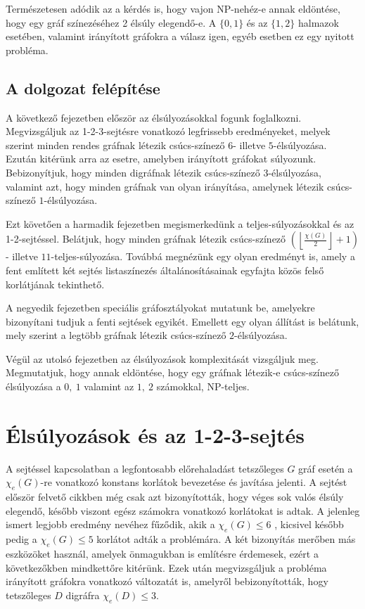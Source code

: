 \documentclass[12pt, a4paper]{report}
\theoremstyle{remark}
\theoremstyle{definition}
\begin{document}
Természetesen adódik az a kérdés is, hogy vajon NP-nehéz-e annak eldöntése, hogy egy gráf színezéséhez 2 élsúly elegendő-e. A $\lbrace 0, 1 \rbrace$ és az $\lbrace 1, 2 \rbrace$ halmazok esetében, valamint irányított gráfokra a válasz igen, egyéb esetben ez egy nyitott probléma.

\section{A dolgozat felépítése}

A következő fejezetben először az élsúlyozásokkal fogunk foglalkozni. Megvizsgáljuk az 1-2-3-sejtésre vonatkozó legfrissebb eredményeket, melyek szerint minden rendes gráfnak létezik csúcs-színező $6$- illetve $5$-élsúlyozása. Ezután kitérünk arra az esetre, amelyben irányított gráfokat súlyozunk. Bebizonyítjuk, hogy minden digráfnak létezik csúcs-színező $3$-élsúlyozása, valamint azt, hogy minden gráfnak van olyan irányítása, amelynek létezik csúcs-színező $1$-élsúlyozása.

Ezt követően a harmadik fejezetben megismerkedünk a teljes-súlyozásokkal és az 1-2-sejtéssel. Belátjuk, hogy minden gráfnak létezik csúcs-színező $\left( \left\lfloor \frac{χ(G)}{2} \right\rfloor + 1 \right)$- illetve $11$-teljes-súlyozása. Továbbá megnézünk egy olyan eredményt is, amely a fent említett két sejtés listaszínezés általánosításainak egyfajta közös felső korlátjának tekinthető.

A negyedik fejezetben speciális gráfosztályokat mutatunk be, amelyekre bizonyítani tudjuk a fenti sejtések egyikét. Emellett egy olyan állítást is belátunk, mely szerint a legtöbb gráfnak létezik csúcs-színező $2$-élsúlyozása.

Végül az utolsó fejezetben az élsúlyozások komplexitását vizsgáljuk meg. Megmutatjuk, hogy annak eldöntése, hogy egy gráfnak létezik-e csúcs-színező élsúlyozása a $0,\ 1$ valamint az $1,\ 2$ számokkal, NP-teljes.

\chapter{Élsúlyozások és az 1-2-3-sejtés}
A sejtéssel kapcsolatban a legfontosabb előrehaladást tetszőleges $G$ gráf esetén a $\chi_e(G)$-re vonatkozó konstans korlátok bevezetése és javítása jelenti. A sejtést először felvető cikkben még csak azt bizonyították, hogy véges sok valós élsúly elegendő, később viszont egész számokra vonatkozó korlátokat is adtak. A jelenleg ismert legjobb eredmény \citeauthor{Kalkowski2010} nevéhez fűződik, akik a $\chi_e(G) \leq 6$ \cite{Kalkowski2009}, kicsivel később pedig a $\chi_e(G) \leq 5$ \cite{Kalkowski2010} korlátot adták a problémára. A két bizonyítás merőben más eszközöket használ, amelyek önmagukban is említésre érdemesek, ezért a következőkben mindkettőre kitérünk. Ezek után megvizsgáljuk a probléma irányított gráfokra vonatkozó változatát is, amelyről \citeauthor{Baudon2014} \cite{Baudon2014} bebizonyították, hogy tetszőleges $D$ digráfra $\chi_e(D) \leq 3$.
\end{document}
